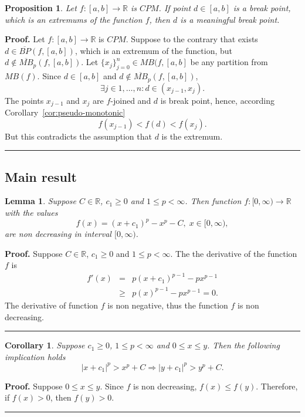 \documentclass[12pt, a4paper]{article}
\newtheorem{lemma}[theorem]{Lemma}
\newtheorem{proposition}[theorem]{Proposition}
\newtheorem{corollary}[theorem]{Corollary}
\newenvironment{proof}[1][Proof]{\noindent \textbf{#1.} }{\  \rule{0.5em}{0.5em}}
\numberwithin{equation}{section}
\begin{document}
\begin{proposition}\label{prop:SplitMinMax}
  Let $f:[a,b] \rightarrow \mathbb{R}$ is $CPM$. 
  If point $d \in [a,b]$ is a break point, which is an extremums of the function $f$, 
  then $d$ is a meaningful break point.
\end{proposition}
\begin{proof}
  Let $f:[a,b] \rightarrow \mathbb{R}$ is $CPM$.
  Suppose to the contrary that exists $d \in \overline{BP}(f,[a,b])$, 
  which is an extremum of the function, but
  $d \notin \overline{MB}_{p}(f,[a,b]) $.
  Let $\{x_j\}_{j=0}^{n} \in MB(f,[a,b]$ be any partition from $MB(f)$. 
  Since $d \in [a,b]$ and $d \notin \overline{MB}_{p}(f,[a,b])$,
  \begin{equation}
    \exists j \in 1,\dots,n: d \in (x_{j-1},x_j) .
  \end{equation}  
  The points $x_{j-1}$ and $x_j$ are $f$-joined and $d$ is break point, 
  hence, according Corollary~\ref{cor:pseudo-monotonic}
  \begin{equation}
    f(x_{j-1})<f(d)<f(x_j).
  \end{equation}
  But this contradicts the assumption that $d$ is the extremum.
\end{proof}


\subsection{Main result}

\begin{lemma}\label{prop:Sp_Monoton}
  Suppose $C \in \mathbb{R}$, $c_1\geq0$ and $1\leq p<\infty$. Then function
  $f:[0,\infty) \rightarrow \mathbb{R}$ with the values
  \begin{equation}
  f(x) = ( x + c_1  )^p - x^p - C,\;x \in [0,\infty),  
  \end{equation}
  are non decreasing in interval $[0,\infty)$. 
\end{lemma}
\begin{proof}
  Suppose $C \in \mathbb{R}$, $c_1\geq0$ and $1\leq p<\infty$. 
  The the derivative of the function $f$ is
  \begin{eqnarray*} 
    f'(x)   &=& p(x+c_1)^{p-1} - px^{p-1} \\
          &\geq& p(x)^{p-1} - px^{p-1} = 0.
  \end{eqnarray*}  
  The derivative of function $f$ is non negative, thus the function $f$ is non decreasing.
\end{proof}
\begin{corollary}\label{cor:convex}
  Suppose $c_1\geq0$, $1\leq p<\infty$ and $0 \leq x \leq y$. Then the following implication holds 
  \begin{equation}
  |x + c_1 |^p > x^p + C \Rightarrow |y + c_1 |^{p} > y^{p} + C.  
  \end{equation}
\end{corollary}
\begin{proof}
  Suppose  $0 \leq x \leq y$. 
  Since $f$ is non decreasing, $f(x) \leq f(y)$.
  Therefore, if $f(x)>0$, then $f(y)>0$.
\end{proof}
\end{document}
